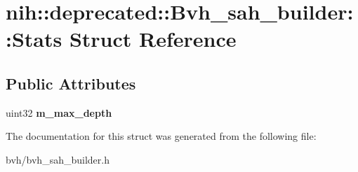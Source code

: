 \hypertarget{structnih_1_1deprecated_1_1_bvh__sah__builder_1_1_stats}{
\section{nih\-:\-:deprecated\-:\-:\-Bvh\-\_\-sah\-\_\-builder\-:\-:\-Stats \-Struct \-Reference}
\label{structnih_1_1deprecated_1_1_bvh__sah__builder_1_1_stats}
}
\subsection*{\-Public \-Attributes}
\begin{DoxyCompactItemize}
\item 
\hypertarget{structnih_1_1deprecated_1_1_bvh__sah__builder_1_1_stats_ac74f44c1f7aa2bb4cbda3e4e5b32120d}{
uint32 {\bfseries m\-\_\-max\-\_\-depth}}
\label{structnih_1_1deprecated_1_1_bvh__sah__builder_1_1_stats_ac74f44c1f7aa2bb4cbda3e4e5b32120d}

\end{DoxyCompactItemize}


\-The documentation for this struct was generated from the following file\-:\begin{DoxyCompactItemize}
\item 
bvh/bvh\-\_\-sah\-\_\-builder.\-h\end{DoxyCompactItemize}
